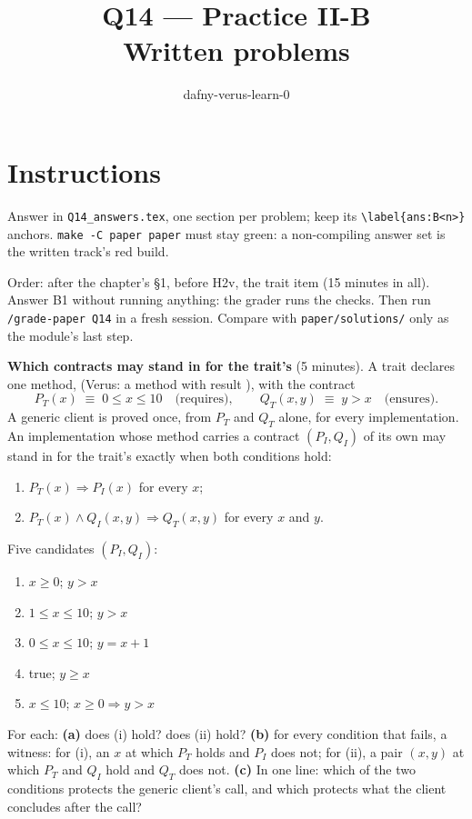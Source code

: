 \documentclass[11pt]{article}
\title{Q14 --- Practice II-B \\ \large Written problems}
\author{dafny-verus-learn-0}
\date{}
\begin{document}
\maketitle

\section*{Instructions}
Answer in \texttt{Q14\_answers.tex}, one section per problem; keep its
\verb+\label{ans:B<n>}+ anchors. \texttt{make -C paper paper} must stay green:
a non-compiling answer set is the written track's red build.

Order: after the chapter's \S1, before H2v, the trait item (15 minutes in
all). Answer B1 without running anything: the grader runs the checks. Then run
\texttt{/grade-paper Q14} in a fresh session. Compare with
\texttt{paper/solutions/} only as the module's last step.

\begin{problem}[concept]\label{prob:B1}
\textbf{Which contracts may stand in for the trait's} (5 minutes). A trait
declares one method,  (Verus: a method
 with result ), with the contract
\[ P_T(x) \;\equiv\; 0 \le x \le 10 \quad\text{(requires)}, \qquad
   Q_T(x, y) \;\equiv\; y > x \quad\text{(ensures)}. \]
A generic client is proved once, from $P_T$ and $Q_T$ alone, for every
implementation. An implementation whose method carries a contract
$(P_I, Q_I)$ of its own may stand in for the trait's exactly when both
conditions hold:
\begin{enumerate}
\item[(i)] $P_T(x) \Rightarrow P_I(x)$ for every $x$;
\item[(ii)] $P_T(x) \wedge Q_I(x, y) \Rightarrow Q_T(x, y)$ for every $x$ and
  $y$.
\end{enumerate}
Five candidates $(P_I, Q_I)$:
\begin{enumerate}
\item[$C_1$] $x \ge 0$; \quad $y > x$
\item[$C_2$] $1 \le x \le 10$; \quad $y > x$
\item[$C_3$] $0 \le x \le 10$; \quad $y = x + 1$
\item[$C_4$] \textsf{true}; \quad $y \ge x$
\item[$C_5$] $x \le 10$; \quad $x \ge 0 \Rightarrow y > x$
\end{enumerate}
For each: \textbf{(a)} does (i) hold? does (ii) hold? \textbf{(b)} for every
condition that fails, a witness: for (i), an $x$ at which $P_T$ holds and $P_I$
does not; for (ii), a pair $(x, y)$ at which $P_T$ and $Q_I$ hold and $Q_T$
does not. \textbf{(c)} In one line: which of the two conditions protects the
generic client's call, and which protects what the client concludes after the
call?
\end{problem}
\end{document}
